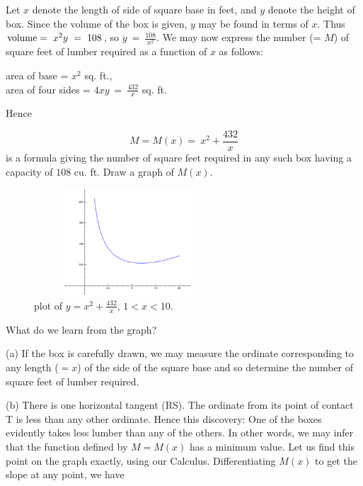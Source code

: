 \begin{example}
{\noindent
Let $x$ denote the length of side of square base in feet,
and $y$ denote the height of box.
Since the volume of the box is given, $y$ may be found in terms of $x$. Thus
${\rm volume} =\ x^2 y\ =\ 108$,
so $y\ =\ \frac{108}{x^2}$.
We may now express the number (= $M$) of square feet of lumber required 
as a function of $x$ as follows: 

\begin{center}
area of base = 	$x^2$ sq. ft.,
\\
area of four sides = $4xy\ =\ \frac{432}{x}$ sq. ft. 
\end{center}
Hence

\[
M = M(x)	=\ x^2 + \frac{432}{x}
\]
is a formula giving the number of square feet required in 
any such box having a capacity of $108$ cu. ft. 
Draw a graph of $M(x)$.

\begin{figure}[h!]
\begin{minipage}{\textwidth}
\begin{center}
\includegraphics[height=4cm,width=7cm]{volume-box2.eps}
\end{center}
\end{minipage}
\caption{\sage plot of $y=x^2 + \frac{432}{x}$, $1<x<10$.}
\label{fig:volume-box2}
\end{figure}

What do we learn from the graph?

(a) If the box is carefully drawn, we may measure the ordinate corresponding 
to any length ($= x$) of the side of the square base and so determine 
the number of square feet of lumber required.

(b) There is one horizontal tangent (RS). The ordinate from its 
point of contact T is less than any other ordinate. 
Hence this discovery: One of the boxes evidently takes less lumber 
than any of the others. In other words, we may infer that the 
function defined by $M=M(x)$ has a minimum value. Let us find this 
point on the graph exactly, using our Calculus. Differentiating $M(x)$
to get the slope at any point, we have

}
\end{example}
